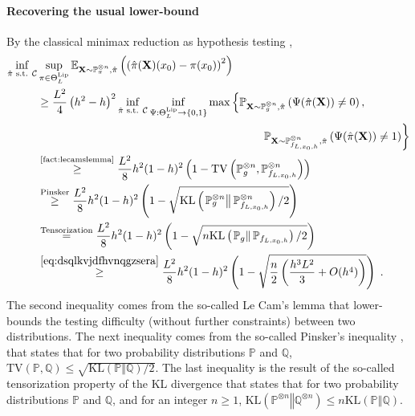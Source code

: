 \documentclass[10pt]{article} %
\newcommand{\Prob}[0]{\mathbb{P}}
\newcommand{\E}[0]{\mathbb{E}}
\newcommand\vect[1]{\mathbf{#1}}
\newcommand\tv[2]{\mathrm{TV}\left( {#1}, {#2} \right)}
\newcommand\kl[2]{\mathrm{KL}\left( \left. {#1}\right\Vert {#2} \right)}
\newcommand\p[1]{\left( {#1}\right)}
\begin{document}
\paragraph{Recovering the usual lower-bound}
By the classical minimax reduction as hypothesis testing ,
\begin{equation}
\label{eq:ghbbvcdjyuhsgdbefr}
    \begin{aligned}
    \inf_{\hat{\pi}  \text{ s.t. } \mathcal{C}} &\sup_{\pi \in \Theta^{\text{Lip}}_L}
    \E_{\vect{X} \sim \Prob_{\pi}^{\otimes n}, \hat{\pi}}\p{\p{\hat{\pi}(\vect{X})(x_0) - \pi(x_0)}^2} \\
    &\geq 
    \frac{L^2 }{4} \p{h^2-h}^2
    \inf_{\hat{\pi}  \text{ s.t. } \mathcal{C}} \inf_{\Psi : \Theta^{\text{Lip}}_L \rightarrow \{0, 1\}}
    \max  \left\{ \Prob_{\vect{X} \sim \Prob_{g}^{\otimes n}, \hat{\pi}}                \p{\Psi(\hat{\pi}(\vect{X})) \neq 0},  \right.\\
        &\quad\quad\quad\quad\quad\quad\quad\quad\quad\quad\quad\quad\quad\quad\quad\quad\quad\quad\quad\quad \left. \Prob_{\vect{X} \sim \Prob_{f_{L, x_0, h}}^{\otimes n}, \hat{\pi}} \p{\Psi(\hat{\pi}(\vect{X})) \neq 1}\right\} \\
    &\stackrel{\text{\Cref{fact:lecamslemma}}}{\geq}
    \frac{L^2}{8}h^2 (1-h)^2 %
    \p{1 - \tv{\Prob_{g}^{\otimes n}}{\Prob_{f_{L, x_0, h}}^{\otimes n}}}  \\
    &\stackrel{\text{Pinsker}}{\geq} \frac{L^2}{8}h^2 (1-h)^2 %
    \p{1 - \sqrt{\kl{\Prob_{g}^{\otimes n}}{\Prob_{f_{L, x_0, h}}^{\otimes n}}/2}} \\
    &\stackrel{\text{Tensorization}}{=} 
    \frac{L^2}{8} h^2 (1-h)^2 %
    \p{1 - \sqrt{n\kl{\Prob_{g}}{\Prob_{f_{L, x_0, h}}}/2}} \\
    &\stackrel{\eqref{eq:dsqlkvjdfhvnqgzsera}}{\geq} 
    \frac{L^2}{8}h^2 (1-h)^2 %
    \p{1 - \sqrt{\frac{n}{2}\p{\frac{h^3 L^2}{3} + O(h^4)}}} \;.
    \end{aligned}
\end{equation}
The second inequality comes from the so-called Le Cam's lemma \cite{rigollet2015high} that lower-bounds the testing difficulty (without further constraints) between two distributions. The next inequality comes from the so-called Pinsker's inequality \cite{tsybakov2003introduction}, that states that for two probability distributions $\mathbb{P}$ and $\mathbb{Q}$, $\tv{\mathbb{P}}{\mathbb{Q}} \leq \sqrt{\kl{\mathbb{P}}{\mathbb{Q}}/2}$. The last inequality is the result of the so-called tensorization property of the KL divergence that states that for two probability distributions $\mathbb{P}$ and $\mathbb{Q}$, and for an integer $n \geq 1$,
$\kl{\mathbb{P}^{\otimes n}}{\mathbb{Q}^{\otimes n}} \leq n \kl{\mathbb{P}}{\mathbb{Q}}$.
\end{document}
